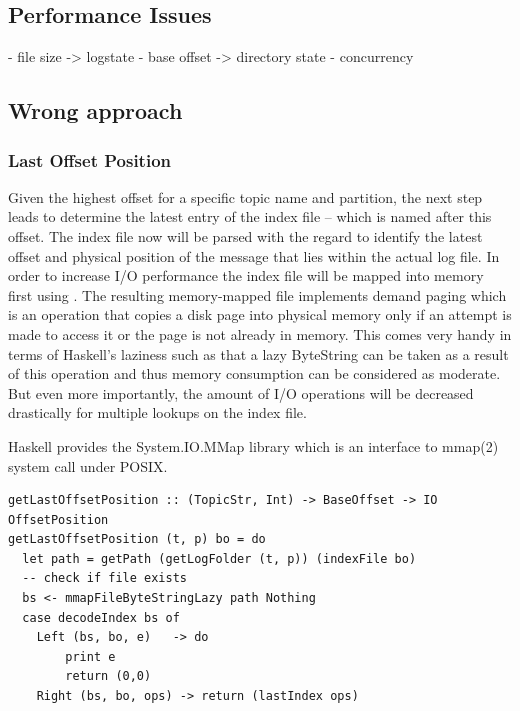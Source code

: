 \subsection{Performance Issues}
\label{subsec:broker-log-performance-issues}

- file size -> logstate
- base offset -> directory state
- concurrency

\subsection{Wrong approach}
\subsubsection{Last Offset Position}

Given the highest offset for a specific topic name and partition, the next step
leads to determine the latest entry of the index file -- which is named after
this offset. The index file now will be parsed with the regard to identify the
latest offset and physical position of the message that lies within the actual
log file. In order to increase I/O performance the index file will be mapped
into memory first using
. The resulting
memory-mapped file implements demand paging which is an operation that copies a
disk page into physical memory only if an attempt is made to access it or the
page is not already in memory. This comes very handy in terms of Haskell's
laziness such as that a lazy ByteString can be taken as a result of this
operation and thus memory consumption can be considered as moderate. But even
more importantly, the amount of I/O operations will be decreased drastically
for multiple lookups on the index file.

Haskell provides the System.IO.MMap library which is an interface to mmap(2)
system call under POSIX. 


\begin{lstlisting}[caption={Get last index entry (OffsetPosition) from index}]
getLastOffsetPosition :: (TopicStr, Int) -> BaseOffset -> IO OffsetPosition
getLastOffsetPosition (t, p) bo = do 
  let path = getPath (getLogFolder (t, p)) (indexFile bo)
  -- check if file exists
  bs <- mmapFileByteStringLazy path Nothing
  case decodeIndex bs of
    Left (bs, bo, e)   -> do
        print e
        return (0,0)
    Right (bs, bo, ops) -> return (lastIndex ops)
\end{lstlisting}

